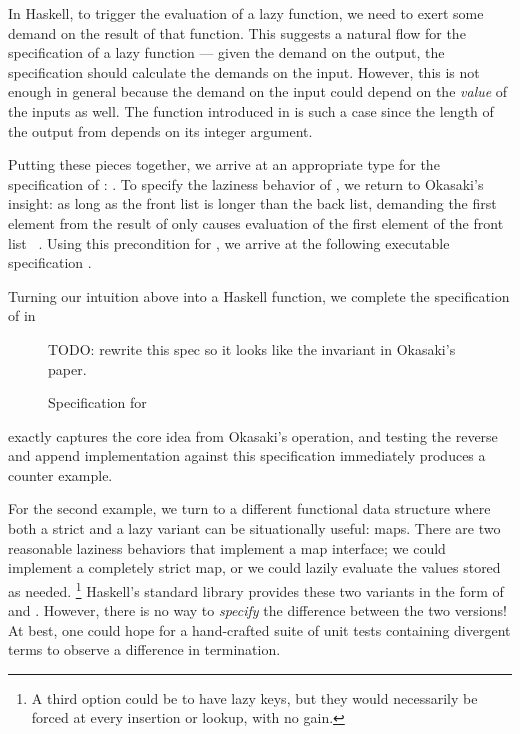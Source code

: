 \documentclass[acmsmall,review]{acmart}\settopmatter{}
\begin{document}
In Haskell, to trigger the evaluation of a lazy function, we need to
exert some demand on the result of that function. This suggests a
natural flow for the specification of a lazy function --- given the
demand on the output, the specification should calculate the demands
on the input. However, this is not enough in general because the
demand on the input could depend on the \textit{value} of the inputs
as well. The  function introduced in  is such
a case since the length of the output from  depends on its
integer argument.

Putting these pieces together, we arrive at an appropriate type for
the specification of : .
%
To specify the laziness behavior of , we return to Okasaki's insight:
as long as the front list is longer than the back list, demanding the first
element from the result of  only causes evaluation of the first
element of the front list ~\cite{Okasaki95simpleand}. Using this precondition
for , we arrive at the following executable
specification .

Turning our intuition above into a Haskell function, we complete the
specification of  in 
\begin{figure}[H]
\centering
{}
\begin{inlinecode}
TODO: rewrite this spec so it looks like the invariant in Okasaki's paper.
\end{inlinecode}
\caption{Specification for }
\label{fig:rotate-spec}
\end{figure}

 exactly captures the core idea from Okasaki's 
operation, and testing the reverse and append implementation against this
specification immediately produces a counter example. 


For the second example, we turn to a different functional data structure where
both a strict and a lazy variant can be situationally useful: maps. There are
two reasonable laziness behaviors that implement a map interface; we could
implement a completely strict map, or we could lazily evaluate the values stored
as needed.
\footnote{A third option could be to have lazy keys, but they would
necessarily be forced at every insertion or lookup, with no gain.}
Haskell's standard library provides these two variants in the form of
 and . However, there is no way
to {\em specify} the difference between the two versions! At best, one
could hope for a hand-crafted suite of unit tests containing divergent
terms to observe a difference in termination.
\end{document}
